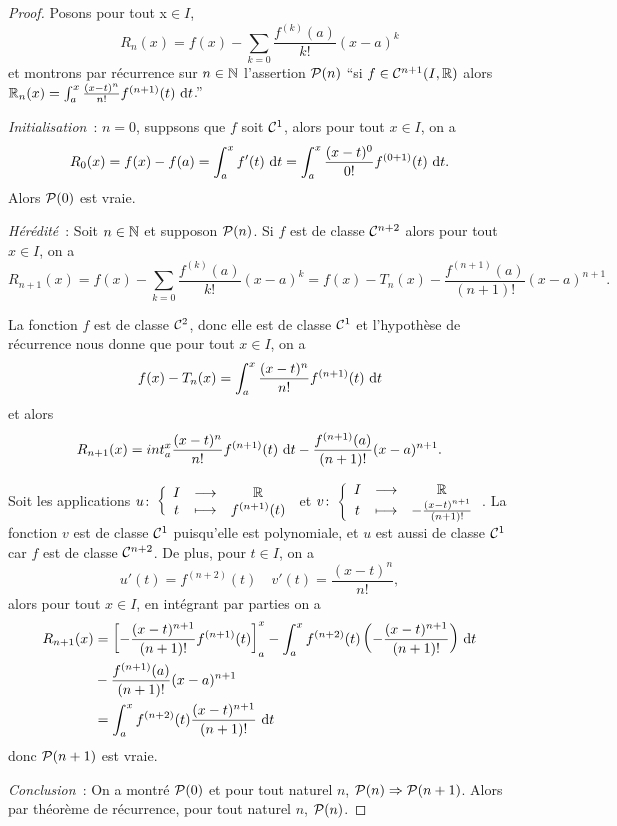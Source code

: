 \begin{proof}
  Posons pour tout x\( \in I\),
  \begin{equation}
    R_n(x) = f(x) -\sum_{k = 0}\frac{f^{(k)}(a)}{k!} (x-a)^k
  \end{equation}
  et montrons par récurrence sur \(n \in \N\) l'assertion \(\P(n)\) ``si \(f \in
  \classe{n+1}(I,\R)\) alors \(\R_n(x) = \int_a^x \frac{(x-t)^n}{n!}
  f^{(n+1)}(t)\,\diff t\).''

  \emph{Initialisation}~: \(n = 0\), suppsons que \(f\) soit \(\classe{1}\), alors
  pour tout \(x \in I\), on a
  \begin{equation}
    R_0(x) = f(x)-f(a) = \int_a^x f'(t)\,\diff t = \int_a^x
    \frac{(x-t)^0}{0!}f^{(0+1)}(t)\,\diff t.
  \end{equation}
  Alors \(\P(0)\) est vraie.

  \emph{Hérédité}~: Soit \(n \in \N\) et supposon \(\P(n)\). Si \(f\) est de
  classe \(\classe{n+2}\) alors pour tout \(x \in I\), on a
  \begin{equation}
    R_{n+1}(x) = f(x) - \sum_{k = 0}\frac{f^{(k)}(a)}{k!} (x-a)^k = f(x) - T_n(x) -
    \frac{f^{(n+1)}(a)}{(n+1)!}(x-a)^{n+1}.
  \end{equation}

  La fonction \(f\) est de classe \(\classe{2}\), donc elle est de classe
  \(\classe{1}\) et l'hypothèse de récurrence nous donne que pour tout \(x \in
  I\), on a
  \begin{equation}
    f(x) - T_n(x) = \int_a^x \frac{(x-t)^n}{n!} f^{(n+1)}(t)\,\diff t
  \end{equation}
  et alors
  \begin{equation}
    R_{n+1}(x) = int_a^x \frac{(x-t)^n}{n!} f^{(n+1)}(t)\,\diff t -
    \frac{f^{(n+1)}(a)}{(n+1)!}(x-a)^{n+1}.
  \end{equation}

  Soit les applications \(\fonction{u}{I}{\R}{t}{f^{(n+1)}(t)}\) et
  \(\fonction{v}{I}{\R}{t}{-\frac{(x-t)^{n+1}}{(n+1)!}}\). La fonction \(v\) est
  de classe \(\classe{1}\) puisqu'elle est polynomiale, et \(u\) est aussi de
  classe \(\classe{1}\) car \(f\) est de classe \(\classe{n+2}\). De plus, pour
  \(t \in I\), on a
  \begin{equation}
    u'(t) = f^{(n+2)}(t) \quad v'(t) = \frac{(x-t)^n}{n!},
  \end{equation}
  alors pour tout \(x \in I\), en intégrant par parties on a
  \begin{align*}
    R_{n+1}(x)& = \left[ -\frac{(x-t)^{n+1}}{(n+1)!}f^{(n+1)}(t)\right]_a^x -
    \int_a^x f^{(n+2)}(t)\left(-\frac{(x-t)^{n+1}}{(n+1)!}\right)\,\diff t \\ &-
    \frac{f^{(n+1)}(a)}{(n+1)!}(x-a)^{n+1} \notag \\
    &= \int_a^x f^{(n+2)}(t) \frac{(x-t)^{n+1}}{(n+1)!}\,\diff t
  \end{align*}
  donc \(\P(n+1)\) est vraie.

  \emph{Conclusion}~: On a montré \(\P(0)\) et pour tout naturel \(n\), \(\P(n)
  \Rightarrow \P(n+1)\). Alors par théorème de récurrence, pour tout naturel
  \(n\), \(\P(n)\).
\end{proof}


